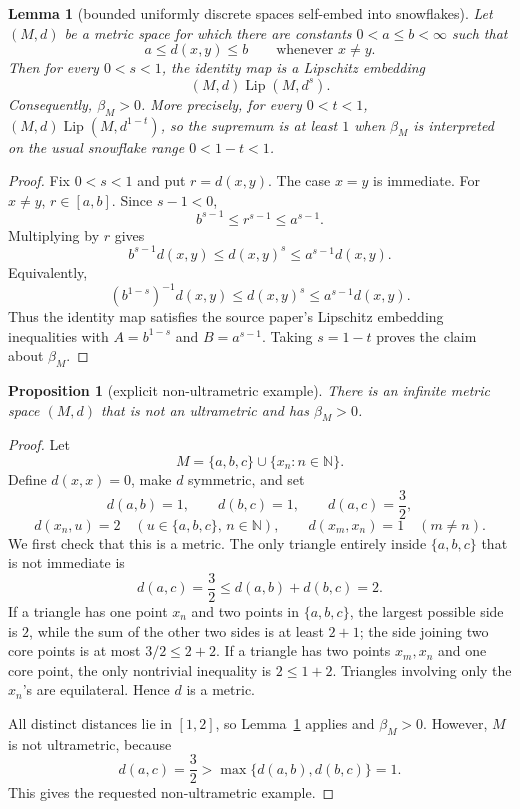 \documentclass[11pt]{article}
\newtheorem{lemma}{Lemma}
\newtheorem{proposition}{Proposition}
\newcommand{\Lip}{\operatorname{Lip}}
\begin{document}
\begin{lemma}[bounded uniformly discrete spaces self-embed into snowflakes]
\label{lem:bud}
Let \((M,d)\) be a metric space for which there are constants
\(0<a\le b<\infty\) such that
\[
a\le d(x,y)\le b\qquad\text{whenever }x\ne y.
\]
Then for every \(0<s<1\), the identity map is a Lipschitz embedding
\[
(M,d)\Lip(M,d^s).
\]
Consequently, \(\beta_M>0\).  More precisely, for every \(0<t<1\),
\((M,d)\Lip(M,d^{1-t})\), so the supremum is at least \(1\) when
\(\beta_M\) is interpreted on the usual snowflake range \(0<1-t<1\).
\end{lemma}

\begin{proof}
Fix \(0<s<1\) and put \(r=d(x,y)\).  The case \(x=y\) is immediate.  For
\(x\ne y\), \(r\in[a,b]\).  Since \(s-1<0\),
\[
b^{s-1}\le r^{s-1}\le a^{s-1}.
\]
Multiplying by \(r\) gives
\[
b^{s-1}d(x,y)\le d(x,y)^s\le a^{s-1}d(x,y).
\]
Equivalently,
\[
(b^{1-s})^{-1}d(x,y)\le d(x,y)^s\le a^{s-1}d(x,y).
\]
Thus the identity map satisfies the source paper's Lipschitz embedding
inequalities with \(A=b^{1-s}\) and \(B=a^{s-1}\).  Taking \(s=1-t\) proves the
claim about \(\beta_M\).
\end{proof}

\begin{proposition}[explicit non-ultrametric example]
\label{prop:example}
There is an infinite metric space \((M,d)\) that is not an ultrametric and has
\(\beta_M>0\).
\end{proposition}

\begin{proof}
Let
\[
M=\{a,b,c\}\cup\{x_n:n\in\mathbb N\}.
\]
Define \(d(x,x)=0\), make \(d\) symmetric, and set
\[
d(a,b)=1,\qquad d(b,c)=1,\qquad d(a,c)=\frac32,
\]
\[
d(x_n,u)=2\quad(u\in\{a,b,c\},\,n\in\mathbb N),
\qquad
d(x_m,x_n)=1\quad(m\ne n).
\]
We first check that this is a metric.  The only triangle entirely inside
\(\{a,b,c\}\) that is not immediate is
\[
d(a,c)=\frac32\le d(a,b)+d(b,c)=2.
\]
If a triangle has one point \(x_n\) and two points in \(\{a,b,c\}\), the
largest possible side is \(2\), while the sum of the other two sides is at
least \(2+1\); the side joining two core points is at most \(3/2\le 2+2\).
If a triangle has two points \(x_m,x_n\) and one core point, the only
nontrivial inequality is \(2\le 1+2\).  Triangles involving only the \(x_n\)'s
are equilateral.  Hence \(d\) is a metric.

All distinct distances lie in \([1,2]\), so Lemma~\ref{lem:bud} applies and
\(\beta_M>0\).  However, \(M\) is not ultrametric, because
\[
d(a,c)=\frac32>\max\{d(a,b),d(b,c)\}=1.
\]
This gives the requested non-ultrametric example.
\end{proof}
\end{document}
